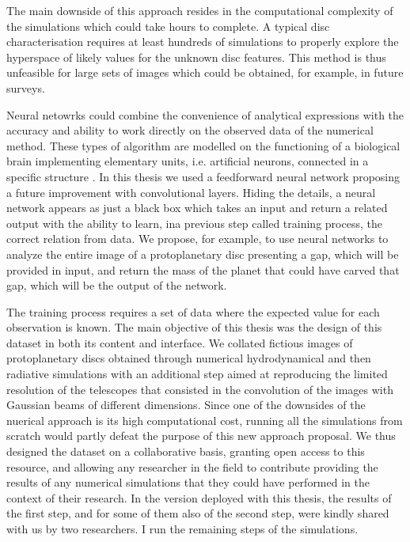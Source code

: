 \documentclass[a4paper,10pt, margin=1cm]{article}
\begin{document}
The main downside of this approach resides in the computational complexity of the simulations which 
could take hours to complete. A typical disc characterisation requires at least
hundreds of simulations to properly explore 
the hyperspace of likely values for the unknown disc features. This method is
thus unfeasible for large sets of images which could be obtained, for example, in future surveys.

Neural netowrks could combine the convenience of analytical expressions with the accuracy and ability to work directly on the observed data
of the numerical method. These types of algorithm are modelled on the functioning of a biological brain implementing 
elementary units, i.e. artificial neurons, connected in a specific structure \citep{ml4physics}. In this thesis we used a feedforward neural network 
proposing a future improvement with convolutional layers.
Hiding the details, a neural network appears as just a black box which takes an input and return a related output with the ability 
to learn, ina previous step called training process, the correct relation from data. We propose, for example, to use neural networks
to analyze the entire image of a protoplanetary disc presenting a gap, which will be provided in input, and return the mass of the 
planet that could have carved that gap, which will be the output of the network. 

The training process requires a set of data where the expected value for each observation is known.
The main objective of this thesis was the design of this dataset in both its content and interface.
We collated fictious images of protoplanetary discs
obtained through numerical hydrodynamical and then radiative simulations with
an additional step aimed at reproducing the limited resolution of the telescopes that consisted in the convolution
of the images with
Gaussian beams of different dimensions.
Since one of the downsides of the nuerical approach is its high computational cost, running all the simulations 
from scratch would partly defeat the purpose of this new approach proposal. 
We thus designed the dataset on a collaborative basis, granting open access to this resource, and allowing any researcher in the field
to contribute providing the results of any numerical simulations that they could have performed in the context of their research.
In the version deployed with this thesis, the results of the first step, and for some of them 
also of the second step, were kindly shared with us 
by two researchers.
I run the remaining steps of the simulations.
\end{document}
